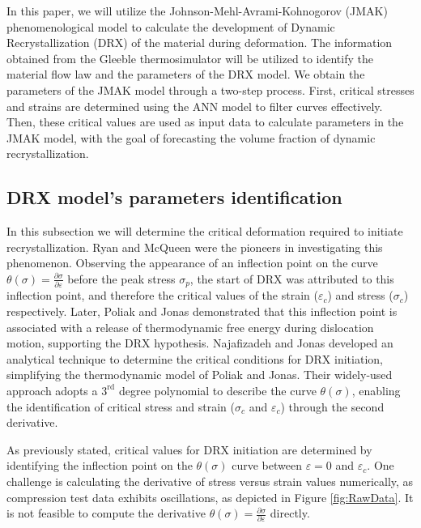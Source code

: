 \documentclass[metals,article,submit,pdftex,moreauthors]{Definitions/mdpi}
\begin{document}
In this paper, we will utilize the Johnson-Mehl-Avrami-Kohnogorov (JMAK) phenomenological model \cite{Avrami-1939} to calculate the development of Dynamic Recrystallization (DRX) of the material during deformation.
The information obtained from the Gleeble thermosimulator will be utilized to identify the material flow law and the parameters of the DRX model.
We obtain the parameters of the JMAK model through a two-step process.
First, critical stresses and strains are determined using the ANN model to filter curves effectively.
Then, these critical values are used as input data to calculate parameters in the JMAK model, with the goal of forecasting the volume fraction of dynamic recrystallization.

\subsection{DRX model's parameters identification\label{subsec:DRXParameters}}

In this subsection we will determine the critical deformation required to initiate recrystallization.
Ryan and McQueen \cite{Ryan-1989, Ryan-1990, Ryan-1990-2} were the pioneers in investigating this phenomenon.
Observing the appearance of an inflection point on the curve $\theta(\sigma)=\frac{\partial \sigma}{\partial \varepsilon}$ before the peak stress $\sigma_p$, the start of DRX was attributed to this inflection point, and therefore the critical values of the strain ($\varepsilon_c$) and stress ($\sigma_c$) respectively.
Later, Poliak and Jonas \cite{Poliak-1996, Poliak-2003, Poliak-2003-2, Jonas-2003} demonstrated that this inflection point is associated with a release of thermodynamic free energy during dislocation motion, supporting the DRX hypothesis.
Najafizadeh and Jonas \cite{Najafizadeh-2006} developed an analytical technique to determine the critical conditions for DRX initiation, simplifying the thermodynamic model of Poliak and Jonas.
Their widely-used approach adopts a $3^\text{rd}$ degree polynomial to describe the curve $\theta(\sigma)$, enabling the identification of critical stress and strain ($\sigma_c$ and $\varepsilon_c$) through the second derivative.

As previously stated, critical values for DRX initiation are determined by identifying the inflection point on the $\theta(\sigma)$ curve between $\varepsilon=0$ and $\varepsilon_c$.
One challenge is calculating the derivative of stress versus strain values numerically, as compression test data exhibits oscillations, as depicted in Figure \ref{fig:RawData}.
It is not feasible to compute the derivative $\theta(\sigma)=\frac{\partial \sigma}{\partial \varepsilon}$ directly.
\end{document}
